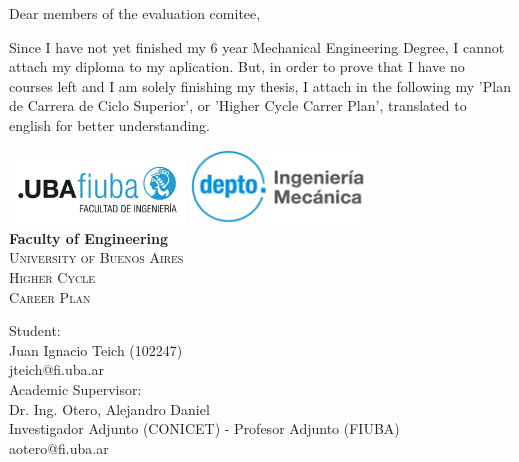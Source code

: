 \documentclass{article}
\newcommand{\thetitle}{Higher Cycle\\ Career Plan}
\newcommand{\theauthorJT}{Juan Ignacio Teich}
\newcommand{\thedate}{}
\numberwithin{equation}{subsection}
\begin{document}
\pagestyle{empty}

Dear members of the evaluation comitee,

\indent \indent Since I have not yet finished my 6 year Mechanical Engineering Degree, I cannot attach my diploma to my aplication. But, in order to prove that I have no courses left and I am solely finishing my thesis, I attach in the following my 'Plan de Carrera de Ciclo Superior', or 'Higher Cycle Carrer Plan', translated to english for better understanding.


\newpage
\pagestyle{fancy}
\begin{titlepage}
    \begin{center}
    \includegraphics[width=0.35\textwidth]{Logo-fiuba-2.png} \hfill \includegraphics[width=0.35\textwidth]{depto.png}\\
    \vspace{1cm}
    {\bfseries \LARGE Faculty of Engineering}\\
    \vspace{0.5cm}
    {\scshape \Large University of Buenos Aires}\\
    \vspace{3cm}
    {\scshape \Huge \thetitle}\\
    \end{center}
    \vfill
    {\Large Student:\\[10pt] \indent\theauthorJT\; (102247)\\[10pt] \indent jteich@fi.uba.ar}\\[20pt]
    {\Large Academic Supervisor:\\[10pt] \indent Dr. Ing. Otero, Alejandro Daniel\\[10pt] \indent Investigador Adjunto (CONICET) - Profesor Adjunto (FIUBA) \\[10pt] \indent aotero@fi.uba.ar}\\
    \vfill
    \begin{center}
		{\large \thedate}
    \end{center}
\end{titlepage}
\end{document}
